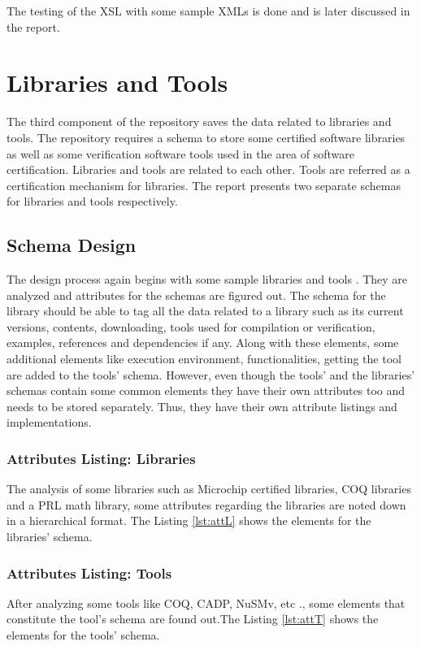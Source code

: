 \documentclass[11pt,letterpaper]{report}
\begin{document}
\bigskip

The testing of the XSL with some sample XMLs is done and is later discussed in the report. 

\chapter{Libraries and Tools}
The third component of the repository saves the data related to libraries and tools. The repository requires a schema to store some certified software libraries as well as some verification software tools used in the area of software certification. Libraries and tools are related to each other. Tools are referred as a certification mechanism for libraries. The report presents two separate schemas for libraries and tools respectively.   

\section{Schema Design}
The design process again begins with some sample libraries and tools \cite{Alea, DFC, MCHIP, BCastleJava, BSharp,Glibc,COQ,CADP,STL}. They are analyzed and attributes for the schemas are figured out. The schema for the library should be able to tag all the data related to a library such as its current versions, contents, downloading, tools used for compilation or verification, examples, references and dependencies if any. Along with these elements, some additional elements like execution environment, functionalities, getting the tool are added to the tools' schema. However, even though the tools' and the libraries' schemas contain some common elements they have their own attributes too and needs to be stored separately. Thus, they have their own attribute listings and implementations.
\subsection{Attributes Listing: Libraries}
The analysis of some libraries such as Microchip certified libraries, COQ libraries and a PRL math library, some attributes regarding the libraries are noted down in a hierarchical format. The Listing \ref{lst:attL} shows the elements for the libraries' schema.

 

\subsection{Attributes Listing: Tools}
After analyzing some tools like COQ, CADP, NuSMv, etc \cite{COQ,CADP}., some elements that constitute the tool's schema are found out.The Listing \ref{lst:attT} shows the elements for the tools' schema. 
\end{document}
